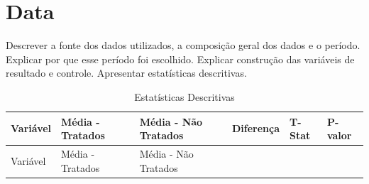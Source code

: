 \documentclass[
  authoryear,
  preprint,
  3p,
  onecolumn]{elsarticle}
\begin{document}
\section{Data}\label{data}

Descrever a fonte dos dados utilizados, a composição geral dos dados e o
período. Explicar por que esse período foi escolhido. Explicar
construção das variáveis de resultado e controle. Apresentar
estatísticas descritivas.

\begin{longtable}[]{@{}
  >{\raggedright\arraybackslash}p{}
  >{\raggedright\arraybackslash}p{}
  >{\raggedright\arraybackslash}p{}
  >{\raggedright\arraybackslash}p{}
  >{\raggedright\arraybackslash}p{}
  >{\raggedright\arraybackslash}p{}@{}}
\caption{Estatísticas Descritivas}\tabularnewline
\toprule\noalign{}
\begin{minipage}[b]{\linewidth}\raggedright
Variável
\end{minipage} & \begin{minipage}[b]{\linewidth}\raggedright
Média - Tratados
\end{minipage} & \begin{minipage}[b]{\linewidth}\raggedright
Média - Não Tratados
\end{minipage} & \begin{minipage}[b]{\linewidth}\raggedright
Diferença
\end{minipage} & \begin{minipage}[b]{\linewidth}\raggedright
T-Stat
\end{minipage} & \begin{minipage}[b]{\linewidth}\raggedright
P-valor
\end{minipage} \\
\midrule\noalign{}
\endfirsthead
\toprule\noalign{}
\begin{minipage}[b]{\linewidth}\raggedright
Variável
\end{minipage} & \begin{minipage}[b]{\linewidth}\raggedright
Média - Tratados
\end{minipage} & \begin{minipage}[b]{\linewidth}\raggedright
Média - Não Tratados
\end{minipage} & \begin{minipage}[b]{\linewidth}\raggedright

\end{minipage}
\end{longtable}
\end{document}
